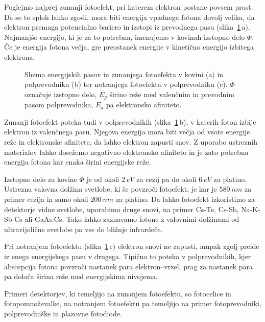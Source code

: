 Poglejmo najprej zunanji fotoefekt, pri katerem elektron postane povsem prost. 
Da se to sploh lahko zgodi, mora biti energija vpadnega fotona dovolj velika, da 
elektron premaga potencialno bariero in izstopi iz prevodnega pasu (slika~\ref{fig:Nivoji}\,a). 
Najmanjšo energijo, ki je za to potrebna, imenujemo v kovinah izstopno delo $\Phi$. 
Če je energija fotona večja, gre preostanek energije v kinetično energijo izbitega
elektrona.

\begin{figure}[h]
\centering
\def\svgwidth{140truemm} 

\caption{Shema energijskih pasov in zunanjega fotoefekta v kovini (a) in polprevodniku (b) ter
notranjega fotoefekta v polprevodniku (c). $\Phi$ označuje izstopno delo, $E_g$ širino reže 
med valenčnim in prevodnim pasom polprevodnika,
$E_a$ pa elektronsko afiniteto. }
\label{fig:Nivoji}
\end{figure}

Zunanji fotoefekt poteka tudi v polprevodnikih (slika~\ref{fig:Nivoji}\,b),
v katerih foton izbije elektron iz valenčnega pasu. Njegova energija mora biti 
večja od vsote energije reže in elektronske afinitete, da lahko elektron zapusti snov. 
Z uporabo ustreznih materialov lahko dosežemo negativno elektronsko afiniteto
in je zato potrebna energija fotona kar enaka širini energijske reže.

Izstopno delo za kovine $\Phi$ je od okoli $2~\si{eV}$ za cezij pa do okoli 
$6~\si{eV}$ za platino. 
Ustrezna valovna dolžina svetlobe, ki še povzroči fotoefekt, je 
kar je $580~\si{nm}$ za primer cezija in samo okoli $200~\si{nm}$ 
za platino. Da lahko fotoefekt izkoristimo za detektorje vidne svetlobe, 
uporabimo druge snovi, na primer Cs-Te, Cs-Sb, Na-K-Sb-Cs ali GaAs:Cs. 
Tako lahko zaznavamo fotone z valovnimi dolžinami od ultravijolične svetlobe 
pa vse do bližnje infrardeče.

Pri notranjem fotoefektu (slika~\ref{fig:Nivoji}\,c) elektron 
snovi ne zapusti, ampak zgolj preide iz enega 
energijskega pasu v drugega. Tipično to poteka v polprevodnikih, kjer absorpcija fotona 
povzroči nastanek para elektron--vrzel, prag za nastanek para pa določa širina reže med 
energijskima nivojema. 

Primeri detektorjev, ki temeljijo na zunanjem fotoefektu, so 
fotocelice in foto\-pomnoževalke, na notranjem fotoefektu pa temeljijo na primer
fotoprevodniki, polprevodniške in plazovne fotodiode.


